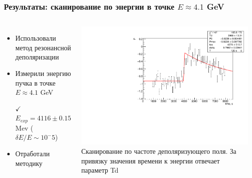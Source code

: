 \documentclass[12pt,aspectratio=169]{beamer}
\begin{document}
\begin{frame}[t]
	\frametitle{Результаты: сканирование по энергии в точке $E\approx 4.1$ GeV}
	\begin{columns}
		\begin{minipage}[t][0.8\textheight]{\linewidth}
			\begin{itemize}
				\item Использовали метод резонансной деполяризации
				\item Измерили энергию пучка в точке $E\approx 4.1$ GeV
				\item[$\checkmark$]$E_{exp} = 4116\pm0.15$  Mev ($\delta E/E \sim 10^-5$)
				\item Отработали методику
			\end{itemize}
		\end{minipage}%
		\begin{minipage}[t][1.\textheight]{\linewidth}
			\includegraphics[width=1\linewidth]{jump1.pdf}
			\footnotesize{Сканирование по частоте деполяризующего поля. За привязку значения времени к энергии отвечает параметр Td}
		\end{minipage}%
	\end{columns}	
\end{frame}
\end{document}
